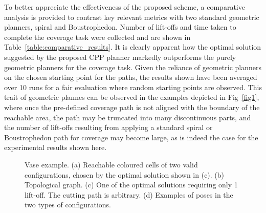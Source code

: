 \documentclass[journal]{IEEEtran}
\begin{document}
To better appreciate the effectiveness of the proposed scheme, a comparative analysis is provided to contrast key relevant metrics with two standard geometric planners, spiral and Boustrophedon. Number of lift-offs  and time taken to complete the coverage task were collected and are shown in Table~\ref{table:comparative_results}. 
It is clearly apparent how the optimal solution suggested by the proposed CPP planner markedly outperforms the purely geometric planners for the coverage task.
Given the reliance of geometric planners on the chosen starting point for the paths, the results shown have been averaged 
over 10 runs for a fair evaluation where random starting points are observed.
This trait of geometric plannes can be observed in the examples depicted in Fig~\ref{fig1}, where once the pre-defined coverage path 
is not aligned with the boundary of the reachable area, 
the path may be truncated into many discontinuous parts, and the number of lift-offs resulting from applying a standard spiral or Boustrophedon path 
for coverage may become large, as is indeed the case for the experimental results shown here. 

\begin{figure}[t]
\centering
{}
\caption{Vase example. (a) Reachable coloured cells of two valid configurations, chosen by the optimal solution shown in (c). 
(b) Topological graph. (c) One of the optimal solutions requiring only 1 lift-off. 
The cutting path is arbitrary. (d)  Examples of poses in the two types of configurations.}
\label{fig:vase_sim}
\end{figure}
\end{document}
